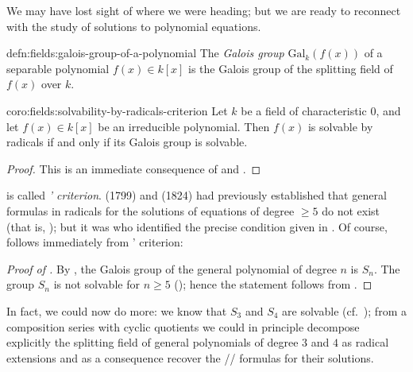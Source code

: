 We may have lost sight of where we were heading; but we are ready to
reconnect with the study of solutions to polynomial equations.
\begin{defn}{}{defn:fields:galois-group-of-a-polynomial}
  The \emph{Galois group} $\mathrm{Gal}_k(f(x))$ of a separable
  polynomial $f(x) \in k[x]$ is the Galois group of the splitting
  field of $f(x)$ over $k$.
\end{defn}
\begin{coro}{}{coro:fields:solvability-by-radicals-criterion}
  Let $k$ be a field of characteristic $0$, and let $f(x) \in k[x]$ be
  an irreducible polynomial. Then $f(x)$ is solvable by radicals if
  and only if its Galois group is solvable.
\end{coro}

\begin{proof}
  This is an immediate consequence of  and
  .
\end{proof}
 is called \emph{' criterion}.
 (1799) and  (1824) had previously
established that general formulas in radicals for the solutions of
equations of degree $\geq 5$ do not exist (that is,
); but it was  who identified the
precise condition given in . Of course,
 follows immediately from '
criterion:

\begin{proof}[Proof of ]
  By , the Galois group of the general polynomial
  of degree $n$ is $S_n$. The group $S_n$ is not solvable for
  $n \geq 5$ (); hence the statement follows
  from .
\end{proof}
In fact, we could now do more: we know that $S_3$ and $S_4$ are
solvable (cf.\ );
from a composition series with cyclic quotients we could in principle
decompose explicitly the splitting field of general polynomials of
degree $3$ and $4$ as radical extensions and as a consequence recover
the // formulas for their
solutions.

